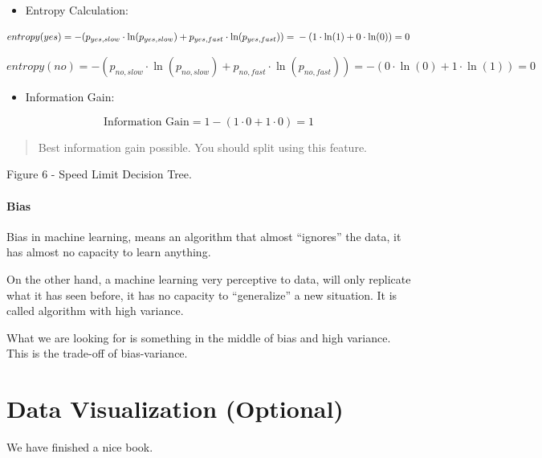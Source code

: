 \documentclass[]{book}
\providecommand{\tightlist}{%
  \setlength{\itemsep}{0pt}\setlength{\parskip}{0pt}}
\begin{document}
\begin{itemize}
\tightlist
\item
  Entropy Calculation:
\end{itemize}

\[entropy(yes) = -(p_{yes,slow} \cdot \ln(p_{yes,slow}) + p_{yes,fast} \cdot \ln(p_{yes,fast})) = \\ -(1 \cdot \ln(1) + 0 \cdot \ln(0)) = 0 \]

\[entropy(no) = -(p_{no,slow} \cdot \ln(p_{no,slow}) + p_{no,fast} \cdot \ln(p_{no,fast})) = -(0 \cdot \ln(0) + 1 \cdot \ln(1)) = 0 \]

\begin{itemize}
\tightlist
\item
  Information Gain:
\end{itemize}

\[\text{Information Gain} = 1 - (1 \cdot 0 + 1 \cdot 0) = 1\]

\begin{quote}
Best information gain possible. You should split using this feature.
\end{quote}

Figure 6 - Speed Limit Decision Tree.

\subsubsection{Bias}\label{bias-1}

Bias in machine learning, means an algorithm that almost ``ignores'' the
data, it has almost no capacity to learn anything.

On the other hand, a machine learning very perceptive to data, will only
replicate what it has seen before, it has no capacity to ``generalize''
a new situation. It is called algorithm with high variance.

What we are looking for is something in the middle of bias and high
variance. This is the trade-off of bias-variance.

\chapter{Data Visualization
(Optional)}\label{data-visualization-optional}

We have finished a nice book.


\end{document}
